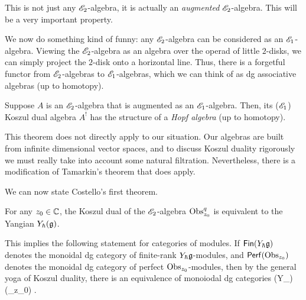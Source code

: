\documentclass[10pt]{amsart}
\begin{document}
This is not just any $\mathscr E_2$-algebra, it is actually an {\em augmented} $\mathscr E_2$-algebra.
This will be a very important property.

We now do something kind of funny: any $\mathscr E_2$-algebra can be considered as an $\mathscr E_1$-algebra. 
Viewing the $\mathscr E_2$-algebra as an algebra over the operad of little $2$-disks, we can simply project the $2$-disk onto a horizontal line.
Thus, there is a forgetful functor from $\mathscr E_2$-algebras to $\mathscr E_1$-algebras, which we can think of as dg associative algebras (up to homotopy).

\begin{thm}
Suppose $A$ is an $\mathscr E_2$-algebra that is augmented as an $\mathscr E_1$-algebra. 
Then, its ($\mathscr E_1$) Koszul dual algebra $A^{!}$ has the structure of a {\em Hopf algebra} (up to homotopy). 
\end{thm}

This theorem does not directly apply to our situation. 
Our algebras are built from infinite dimensional vector spaces, and to discuss Koszul duality rigorously we must really take 
into account some natural filtration. 
Nevertheless, there is a modification of Tamarkin's theorem that does apply. 

We can now state Costello's first theorem.

\begin{thm} 
For any $z_0 \in \mathbb C$, the Koszul dual of the $\mathscr E_2$-algebra ${\rm Obs}^q_{z_0}$ is equivalent to the Yangian $Y_\hbar(\mathfrak g)$. 
\end{thm}

\def\Fin{\mathsf{Fin}}
\def\Perf{\mathsf{Perf}}
This implies the following statement for categories of modules. 
If $\Fin(Y_\hbar\fg)$ denotes the monoidal dg category of finite-rank $Y_\hbar \mathfrak g$-modules, and $\Perf(\Obs_{z_0})$ denotes the monoidal dg category of perfect ${\rm Obs}_{z_0}$-modules, then by the general yoga of Koszul duality, there is an equivalence of monoiodal dg categories 
\ben
\Fin(Y_\hbar \fg) \simeq \Perf(\Obs_{z_0}) .
\een
\end{document}
